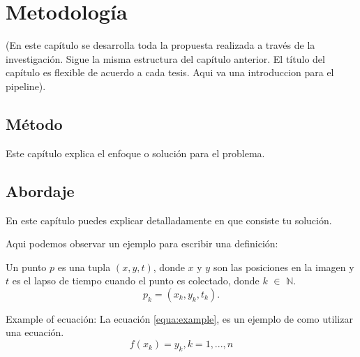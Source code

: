 \chapter{Metodología}
\label{chap:cha4}

(En este capítulo se desarrolla toda la propuesta realizada a través de la investigación. Sigue la misma estructura del capítulo anterior. El título del capítulo es flexible de acuerdo a cada tesis. Aqui va una introduccion para el pipeline).

\section{Método}
Este capítulo explica el enfoque o solución para el problema.


\section{Abordaje}
En este capítulo puedes explicar detalladamente en que consiste tu solución.

Aqui podemos observar un ejemplo para escribir una definición:

\begin{defn}
Un punto $p$ es una tupla $(x, y, t)$, donde $x$ y $y$ son las posiciones en la imagen y $t$ es el lapso de tiempo cuando el punto es colectado, donde $k$ $\in$ $\mathds{N}$.
\begin{equation}
	p_k = (x_k,y_k,t_k).
\end{equation}
\end{defn}


Example of ecuación:
La ecuación \ref{equa:example}, es un ejemplo de como utilizar una ecuación.
\begin{equation}
    \label{equa:example}
	f(x_k) = y_k, k=1, ..., n
\end{equation}
